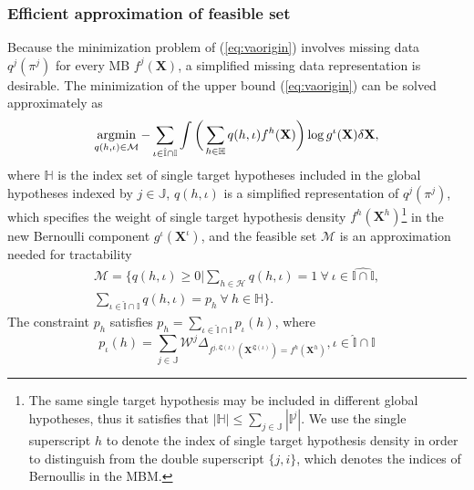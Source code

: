 \documentclass[journal]{IEEEtran}
\begin{document}
\subsubsection{Efficient approximation of feasible set}

Because the minimization problem of (\ref{eq:vaorigin}) involves missing data $q^j(\pi^j)$ for every MB $f^j(\mathbf{X})$, a simplified missing data representation is desirable. The minimization of the upper bound (\ref{eq:vaorigin}) can be solved approximately as \cite{variational}
\begin{equation}
\operatornamewithlimits{argmin}_{q(h,\iota)\in\mathcal{M}}-\sum_{\iota\in\hat{\mathbb{I}}\cap\mathbb{I}}\int\bigg(\sum_{h\in\mathbb{H}}q(h,\iota)f^h(\mathbf{X})\bigg)\log g^{\iota}(\mathbf{X})\delta\mathbf{X},
\label{eq:feasibleset}
\end{equation}
where $\mathbb{H}$ is the index set of single target hypotheses included in the global hypotheses indexed by $j\in\mathbb{J}$, $q(h,\iota)$ is a simplified representation of $q^j(\pi^j)$, which specifies the weight of single target hypothesis density $f^h(\mathbf{X}^h)$\footnote{The same single target hypothesis may be included in different global hypotheses, thus it satisfies that $|\mathbb{H}|\leq\sum_{j\in\mathbb{J}}|\mathbb{I}^j|$. We use the single superscript $h$ to denote the index of single target hypothesis density in order to distinguish from the double superscript $\{j,i\}$, which denotes the indices of Bernoullis in the MBM.} in the new Bernoulli component $g^{\iota}(\mathbf{X}^{\iota})$, and the feasible set $\mathcal{M}$ is an approximation needed for tractability \cite{variational}
\begin{multline}
    \mathcal{M} = \Bigg\{q(h,\iota)\geq0\Bigg|\sum_{h\in\mathcal{H}}q(h,\iota)=1 ~\forall~ \iota\in\hat{\mathbb{I}\cap\mathbb{I}},\\\sum_{\iota\in\hat{\mathbb{I}}\cap\mathbb{I}}q(h,\iota)=p_h ~\forall~ h\in\mathbb{H}\Bigg\}.
    \label{eq:polytope}
\end{multline}
The constraint $p_h$ satisfies $p_h=\sum_{\iota\in\hat{\mathbb{I}}\cap\mathbb{I}}p_{\iota}(h)$, where
\begin{equation}
    p_{\iota}(h)=
      \sum_{j\in\mathbb{J}}\mathcal{W}^j\Delta_{f^{j,\mathfrak{L}(\iota)}(\mathbf{X}^{\mathfrak{L}(\iota)})=f^h(\mathbf{X}^h)}, \iota\in\hat{\mathbb{I}}\cap\mathbb{I}
\label{eq:marginalprob}
\end{equation}
\end{document}
